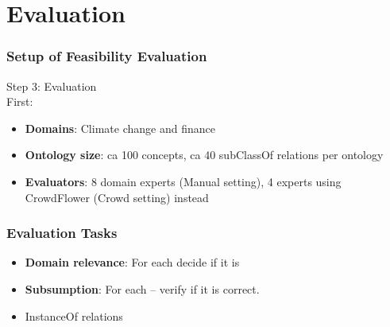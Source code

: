 \documentclass{beamer}
\begin{document}


\section{Evaluation}

\begin{frame}
 \frametitle{Setup of Feasibility Evaluation}

    \huge Step 3: Evaluation \\ \large
    \vspace{0.5cm}
    \large
    First: 
 
  \begin{itemize}
        \item \textbf{Domains}: Climate change and finance
        \item \textbf{Ontology size}: ca 100 concepts, ca 40 subClassOf relations per ontology
        \item \textbf{Evaluators}: 8 domain experts (Manual setting), 4 experts using CrowdFlower (Crowd setting) instead
  \end{itemize}
\end{frame}

\begin{frame}
  \frametitle{Evaluation Tasks}
  \begin{itemize}
        \item \textbf{Domain relevance}: For each  decide if it is 
        \item \textbf{Subsumption}: For each  -- verify if it is correct.
        \item InstanceOf relations
  \end{itemize}
\end{frame}
\end{document}
